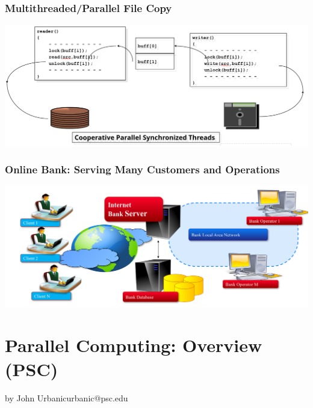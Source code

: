 \documentclass[12pt, a4paper]{book}
\begin{document}
\subsection{Multithreaded/Parallel File Copy}
\includegraphics[width=0.7\linewidth]{figures/file-copy.png}

\subsection{Online Bank: Serving Many Customers and Operations}
\includegraphics[width=0.5\linewidth]{figures/online-banking.png}






















\chapter{Parallel Computing: Overview (PSC)}{by John Urbanicurbanic@psc.edu}
\end{document}
